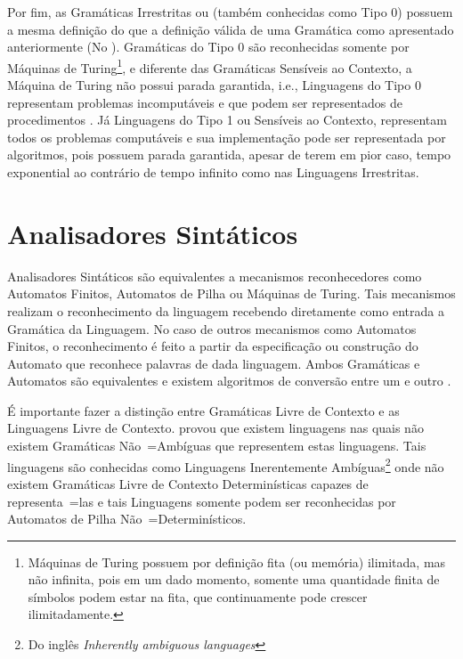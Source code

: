 {    Por fim,
    as Gramáticas Irrestritas ou (também conhecidas como Tipo 0) possuem a mesma definição do
    que a definição válida de uma Gramática como apresentado anteriormente (No
    ).
    Gramáticas do Tipo 0 são reconhecidas somente por Máquinas de Turing\footnote{Máquinas
    de Turing possuem por definição fita (ou memória) ilimitada,
    mas não infinita,
    pois em um dado momento,
    somente uma quantidade finita de símbolos podem estar na fita,
    que continuamente pode crescer ilimitadamente.
    },
    e diferente das Gramáticas Sensíveis ao Contexto,
    a Máquina de Turing não possui parada garantida,
    i.e.,
    Linguagens do Tipo 0 representam problemas incomputáveis e
    que podem ser representados de procedimentos \cite{sipserBook}.
    Já Linguagens do Tipo 1 ou Sensíveis ao Contexto,
    representam todos os problemas computáveis e
    sua implementação pode ser representada por algoritmos,
    pois possuem parada garantida,
    apesar de terem em pior caso,
    tempo exponential ao contrário de tempo infinito como nas Linguagens Irrestritas.


\section{Analisadores Sintáticos}
\label{analisadoresSintaticos}

    Analisadores Sintáticos são equivalentes a mecanismos reconhecedores como Automatos Finitos,
    Automatos de Pilha ou Máquinas de Turing.
    Tais mecanismos realizam o reconhecimento da linguagem recebendo
    diretamente como entrada a Gramática da Linguagem.
    No caso de outros mecanismos como Automatos Finitos,
    o reconhecimento é feito a partir da especificação ou construção
    do Automato que reconhece palavras de dada linguagem.
    Ambos Gramáticas e
    Automatos são equivalentes e
    existem algoritmos de conversão entre um e
    outro \cite{hopcroftBook}.

    É importante fazer a distinção entre Gramáticas Livre de Contexto e
    as Linguagens Livre de Contexto.
     provou que existem linguagens nas quais não
    existem Gramáticas Não~=Ambíguas que representem estas linguagens.
    Tais linguagens são conhecidas como Linguagens Inerentemente Ambíguas\footnote{Do
    inglês \textit{Inherently ambiguous languages}} onde não existem Gramáticas
    Livre de Contexto Determinísticas capazes de representa~=las e
    tais Linguagens somente podem ser reconhecidas por Automatos de Pilha Não~=Determinísticos.

}
